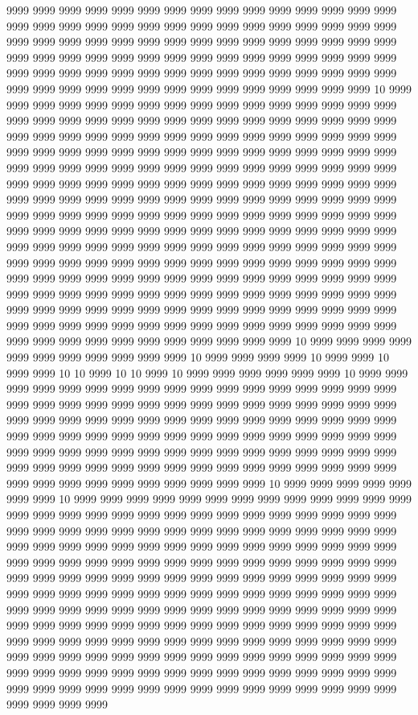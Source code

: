 9999 9999 9999 9999 9999 9999 9999 9999 9999 9999 9999 9999 9999 9999 9999 9999 9999 9999 9999 9999 9999 9999 9999 9999 9999 9999 9999 9999 9999 9999 9999 9999 9999 9999 9999 9999 9999 9999 9999 9999 9999 9999 9999 9999 9999 9999 9999 9999 9999 9999 9999 9999 9999 9999 9999 9999 9999 9999 9999 9999 9999 9999 9999 9999 9999 9999 9999 9999 9999 9999 9999 9999 9999 9999 9999 9999 9999 9999 9999 9999 9999 9999 9999 9999 9999 9999 9999 9999 9999 10 9999 9999 9999 9999 9999 9999 9999 9999 9999 9999 9999 9999 9999 9999 9999 9999 9999 9999 9999 9999 9999 9999 9999 9999 9999 9999 9999 9999 9999 9999 9999 9999 9999 9999 9999 9999 9999 9999 9999 9999 9999 9999 9999 9999 9999 9999 9999 9999 9999 9999 9999 9999 9999 9999 9999 9999 9999 9999 9999 9999 9999 9999 9999 9999 9999 9999 9999 9999 9999 9999 9999 9999 9999 9999 9999 9999 9999 9999 9999 9999 9999 9999 9999 9999 9999 9999 9999 9999 9999 9999 9999 9999 9999 9999 9999 9999 9999 9999 9999 9999 9999 9999 9999 9999 9999 9999 9999 9999 9999 9999 9999 9999 9999 9999 9999 9999 9999 9999 9999 9999 9999 9999 9999 9999 9999 9999 9999 9999 9999 9999 9999 9999 9999 9999 9999 9999 9999 9999 9999 9999 9999 9999 9999 9999 9999 9999 9999 9999 9999 9999 9999 9999 9999 9999 9999 9999 9999 9999 9999 9999 9999 9999 9999 9999 9999 9999 9999 9999 9999 9999 9999 9999 9999 9999 9999 9999 9999 9999 9999 9999 9999 9999 9999 9999 9999 9999 9999 9999 9999 9999 9999 9999 9999 9999 9999 9999 9999 9999 9999 9999 9999 9999 9999 9999 9999 9999 9999 9999 9999 9999 9999 9999 9999 9999 9999 9999 9999 9999 9999 9999 9999 9999 9999 9999 9999 9999 9999 9999 9999 9999 9999 9999 9999 9999 9999 9999 9999 10 9999 9999 9999 9999 9999 9999 9999 9999 9999 9999 9999 10 9999 9999 9999 9999 10 9999 9999 10 9999 9999 10 10 9999 10 10 9999 10 9999 9999 9999 9999 9999 9999 10 9999 9999 9999 9999 9999 9999 9999 9999 9999 9999 9999 9999 9999 9999 9999 9999 9999 9999 9999 9999 9999 9999 9999 9999 9999 9999 9999 9999 9999 9999 9999 9999 9999 9999 9999 9999 9999 9999 9999 9999 9999 9999 9999 9999 9999 9999 9999 9999 9999 9999 9999 9999 9999 9999 9999 9999 9999 9999 9999 9999 9999 9999 9999 9999 9999 9999 9999 9999 9999 9999 9999 9999 9999 9999 9999 9999 9999 9999 9999 9999 9999 9999 9999 9999 9999 9999 9999 9999 9999 9999 9999 9999 9999 9999 9999 9999 9999 9999 9999 9999 9999 9999 10 9999 9999 9999 9999 9999 9999 9999 10 9999 9999 9999 9999 9999 9999 9999 9999 9999 9999 9999 9999 9999 9999 9999 9999 9999 9999 9999 9999 9999 9999 9999 9999 9999 9999 9999 9999 9999 9999 9999 9999 9999 9999 9999 9999 9999 9999 9999 9999 9999 9999 9999 9999 9999 9999 9999 9999 9999 9999 9999 9999 9999 9999 9999 9999 9999 9999 9999 9999 9999 9999 9999 9999 9999 9999 9999 9999 9999 9999 9999 9999 9999 9999 9999 9999 9999 9999 9999 9999 9999 9999 9999 9999 9999 9999 9999 9999 9999 9999 9999 9999 9999 9999 9999 9999 9999 9999 9999 9999 9999 9999 9999 9999 9999 9999 9999 9999 9999 9999 9999 9999 9999 9999 9999 9999 9999 9999 9999 9999 9999 9999 9999 9999 9999 9999 9999 9999 9999 9999 9999 9999 9999 9999 9999 9999 9999 9999 9999 9999 9999 9999 9999 9999 9999 9999 9999 9999 9999 9999 9999 9999 9999 9999 9999 9999 9999 9999 9999 9999 9999 9999 9999 9999 9999 9999 9999 9999 9999 9999 9999 9999 9999 9999 9999 9999 9999 9999 9999 9999 9999 9999 9999 9999 9999 9999 9999 9999 9999 9999 9999 9999 9999 9999 9999 9999 9999 